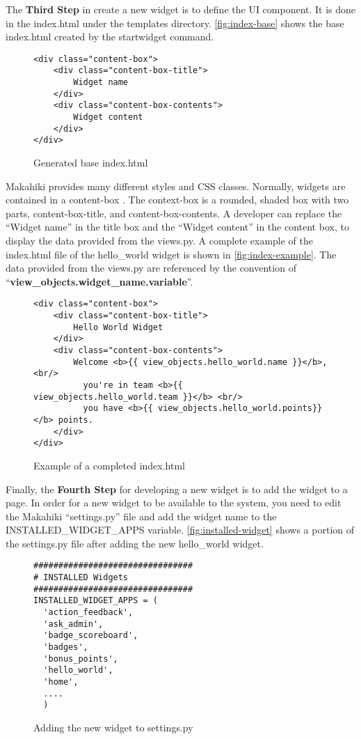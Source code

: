 The {\bf Third Step} in create a new widget is to define the UI component. It is done in the index.html under the templates directory.
\autoref{fig:index-base} shows the base index.html created by the startwidget command.

\begin{figure}[!ht]
\begin{lstlisting}
<div class="content-box">
    <div class="content-box-title">
        Widget name
    </div>
    <div class="content-box-contents">
        Widget content
    </div>
</div>
\end{lstlisting}
\caption{Generated base index.html}
\label{fig:index-base}
\end{figure}

Makahiki provides many different styles and CSS classes. Normally, widgets are contained in a content-box . The context-box is a rounded, shaded box with two parts, content-box-title, and content-box-contents. A developer can replace the ``Widget name'' in the title box and the ``Widget content'' in the content box, to display the data provided from the views.py. A complete example of the index.html file of the hello\_world widget is shown in \autoref{fig:index-example}. The data provided from the views.py are referenced by the convention of ``{\bf view\_objects.widget\_name.variable}''.

\begin{figure}[!ht]
\begin{lstlisting}
<div class="content-box">
    <div class="content-box-title">
        Hello World Widget
    </div>
    <div class="content-box-contents">
        Welcome <b>{{ view_objects.hello_world.name }}</b>, <br/>
          you're in team <b>{{ view_objects.hello_world.team }}</b> <br/>
          you have <b>{{ view_objects.hello_world.points}}</b> points.
    </div>
</div>
\end{lstlisting}
\caption{Example of a completed index.html}
\label{fig:index-example}
\end{figure}

Finally, the {\bf Fourth Step} for developing a new widget is to add the widget to a page. In order for a new widget to be available to the system, you need to edit the Makahiki ``settings.py'' file and add the widget name to the INSTALLED\_WIDGET\_APPS variable. \autoref{fig:installed-widget} shows a portion of the settings.py file after adding the new hello\_world widget. 
\begin{figure}[!ht]
\begin{lstlisting}
################################
# INSTALLED Widgets
################################
INSTALLED_WIDGET_APPS = (
  'action_feedback',
  'ask_admin',
  'badge_scoreboard',
  'badges',
  'bonus_points',
  'hello_world',
  'home',
  ....
  )
\end{lstlisting}
\caption{Adding the new widget to settings.py}
\label{fig:installed-widget}
\end{figure}

